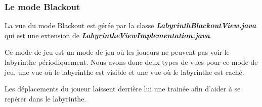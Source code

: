 \subsubsection*{Le mode Blackout}

La vue du mode Blackout est gérée par la classe \textbf{\textit{LabyrinthBlackoutView.java}} qui est une extension de \textbf{\textit{LabyrintheViewImplementation.java}}.

Ce mode de jeu est un mode de jeu où les joueurs ne peuvent pas voir le labyrinthe périodiquement. Nous avons donc deux types de vues pour ce mode de jeu, une vue où le labyrinthe est visible et une vue où le labyrinthe est caché.

Les déplacements du joueur laissent derrière lui une trainée afin d'aider à se repérer dans le labyrinthe.

